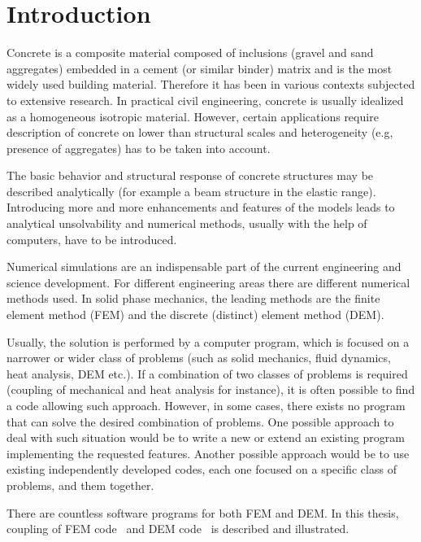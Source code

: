 \chapter{Introduction}

Concrete is a composite material composed of inclusions (gravel and sand aggregates) embedded in a cement (or similar binder) matrix and is the most widely used building material.
Therefore it has been in various contexts subjected to extensive research.
In practical civil engineering, concrete is usually idealized as a homogeneous isotropic material.
However, certain applications require description of concrete on lower than structural scales and heterogeneity (e.g, presence of aggregates) has to be taken into account.

The basic behavior and structural response of concrete structures may be described analytically (for example a beam structure in the elastic range).
Introducing more and more enhancements and features of the models leads to analytical unsolvability and numerical methods, usually with the help of computers, have to be introduced.

Numerical simulations are an indispensable part of the current engineering and science development.
For different engineering areas there are different numerical methods used.
In solid phase mechanics, the leading methods are the finite element method (FEM) and the discrete (distinct) element method (DEM).

Usually, the solution is performed by a computer program, which is focused on a narrower or wider class of problems (such as solid mechanics, fluid dynamics, heat analysis, DEM etc.).
If a combination of two classes of problems is required (coupling of mechanical and heat analysis for instance), it is often possible to find a code allowing such approach.
However, in some cases, there exists no program that can solve the desired combination of problems.
One possible approach to deal with such situation would be to write a new or extend an existing program implementing the requested features.
Another possible approach would be to use existing independently developed codes, each one focused on a specific class of problems, and  them together.

There are countless software programs for both FEM and DEM.
In this thesis, coupling of FEM code \OOFEM\ and DEM code \YADE\ is described and illustrated.



